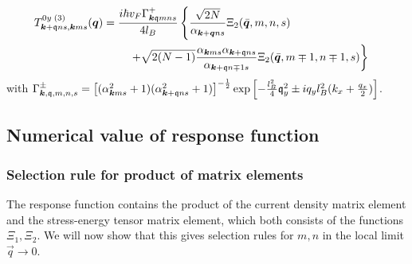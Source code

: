 \begin{align}
  T^{0y\; (3)}_{\vec{k}+\qvec{q}ns, \vec{k}ms}(\vec{q}) &=
                                                         \begin{multlined}[t]
                                                           \frac{i\hbar v_{F} \Gamma^{+} _{\vec{k} \qvec{q} m n s} }{4 l_B}
                                                           \left\{
                                                             \frac{\sqrt{2 N} }{\alpha _{\vec{k} + \vec{q} n s}}
                                                             \Xi _2(\bar{\vec{q}}, m, n, s)
                                                             \right.\\
                                                             \left.+
                                                             \sqrt{2(N-1)}
                                                             \frac{\alpha _{\vec{k} m s} \alpha _{\vec{k} + \qvec{q} n s}}{\alpha _{\vec{k} + \qvec{q} n\mp 1 s}}
                                                             \Xi _2(\bar{\vec{q}}, m\mp 1, n\mp 1, s)
                                                           \right\}
                                                         \end{multlined}
\end{align}
with
$
\Gamma^{\pm} _{\bm{k}, \mathfrak{q}, m, n, s} =
\left[(\alpha _{\bm{k}m s}^2 + 1) (\alpha _{\bm{k} + \mathfrak{q} n s}^2 + 1) \right]^{-\frac{1}{2}} \exp \left[ -\frac{l_B^2}{4} \mathfrak{q}_y^2 \pm iq_y l_B^2 (k_x + \frac{q_x}{2}) \right]
$.

\subsection{Numerical value of response function}
\subsubsection{Selection rule for product of matrix elements}
The response function contains the product of the current density matrix element and the stress-energy tensor matrix element, which both consists of the functions $\Xi_1, \Xi _2$.
We will now show that this gives selection rules for $m,n$ in the local limit $\vec{q} \to  0$.

